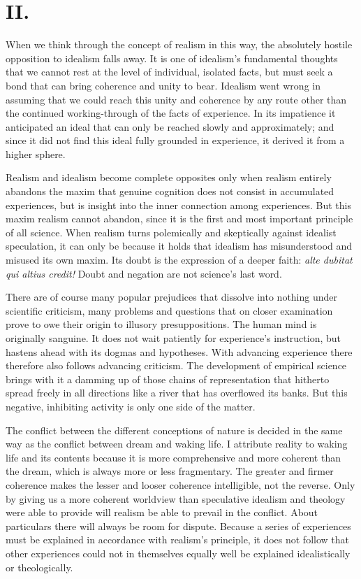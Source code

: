 \documentclass[12pt,a4paper]{article}
\begin{document}
\section*{II.}

When we think through the concept of realism in this way, the absolutely
hostile opposition to idealism falls away. It is one of idealism's
fundamental thoughts that we cannot rest at the level of individual,
isolated facts, but must seek a bond that can bring coherence and unity
to bear. Idealism went wrong in assuming that we could reach this unity
and coherence by any route other than the continued working-through of
the facts of experience. In its impatience it anticipated an ideal that
can only be reached slowly and approximately; and since it did not find
this ideal fully grounded in experience, it derived it from a higher
sphere.

Realism and idealism become complete opposites only when realism
entirely abandons the maxim that genuine cognition does not consist in
accumulated experiences, but is insight into the inner connection among
experiences. But this maxim realism cannot abandon, since it is the first
and most important principle of all science. When realism turns
polemically and skeptically against idealist speculation, it can only be
because it holds that idealism has misunderstood and misused its own
maxim. Its doubt is the expression of a deeper faith: \textit{alte dubitat
qui altius credit!} Doubt and negation are not science's last word.

There are of course many popular prejudices that dissolve into nothing
under scientific criticism, many problems and questions that on closer
examination prove to owe their origin to illusory presuppositions. The
human mind is originally sanguine. It does not wait patiently for
experience's instruction, but hastens ahead with its dogmas and
hypotheses. With advancing experience there therefore also follows
advancing criticism. The development of empirical science brings with it
a damming up of those chains of representation that hitherto spread
freely in all directions like a river that has overflowed its banks. But
this negative, inhibiting activity is only one side of the matter.

The conflict between the different conceptions of nature is decided in
the same way as the conflict between dream and waking life. I attribute
reality to waking life and its contents because it is more comprehensive
and more coherent than the dream, which is always more or less
fragmentary. The greater and firmer coherence makes the lesser and looser
coherence intelligible, not the reverse. Only by giving us a more coherent
worldview than speculative idealism and theology were able to provide will
realism be able to prevail in the conflict. About particulars there will
always be room for dispute. Because a series of experiences must be
explained in accordance with realism's principle, it does not follow that
other experiences could not in themselves equally well be explained
idealistically or theologically.
\end{document}
